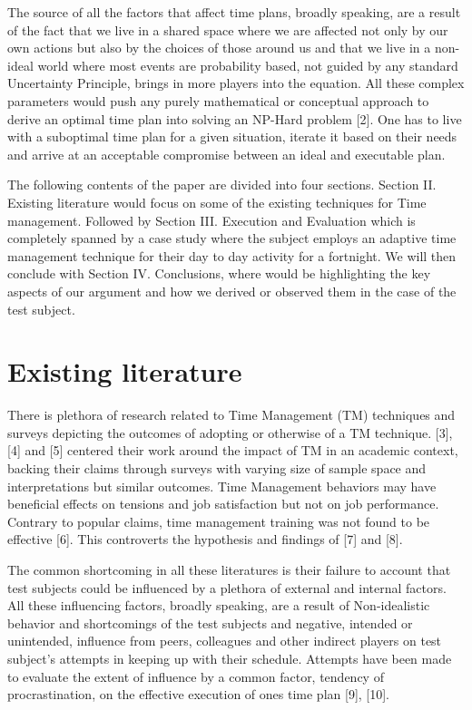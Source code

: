 \documentclass[conference]{IEEEtran}
\begin{document}
The source of all the factors that affect time plans, broadly speaking, are a result of the fact that we live in a shared space where we are affected not only by our own actions but also by the choices of those around us and that we live in a non-ideal world where most events are probability based, not guided by any standard Uncertainty Principle, brings in more players into the equation. All these complex parameters would push any purely mathematical or conceptual approach to derive an optimal time plan into solving an NP-Hard problem [2]. One has to live with a suboptimal time plan for a given situation, iterate it based on their needs and arrive at an acceptable compromise between an ideal and executable plan.

The following contents of the paper are divided into four sections. Section II. Existing literature would focus on some of the existing techniques for Time management. Followed by Section III. Execution and Evaluation which is completely spanned by a case study where the subject employs an adaptive time management technique for their day to day activity for a fortnight. We will then conclude with Section IV. Conclusions, where would be highlighting the key aspects of our argument and how we derived or observed them in the case of the test subject.

\section{Existing literature}
There is plethora of research related to Time Management (TM) techniques and surveys depicting the outcomes of adopting or otherwise of a TM technique. [3], [4] and [5] centered their work around the impact of TM in an academic context, backing their claims through surveys with varying size of sample space and interpretations but similar outcomes. Time Management behaviors may have beneficial effects on tensions and job satisfaction but not on job performance. Contrary to popular claims, time management training was not found to be effective [6]. This controverts the hypothesis and findings of [7] and [8].

The common shortcoming in all these literatures is their failure to account that test subjects could be influenced by a plethora of external and internal factors. All these influencing factors, broadly speaking, are a result of Non-idealistic behavior and shortcomings of the test subjects and negative, intended or unintended, influence from peers, colleagues and other indirect players on test subject's attempts in keeping up with their schedule. Attempts have been made to evaluate the extent of influence by a common factor, tendency of procrastination, on the effective execution of ones time plan [9], [10]. 
\end{document}

